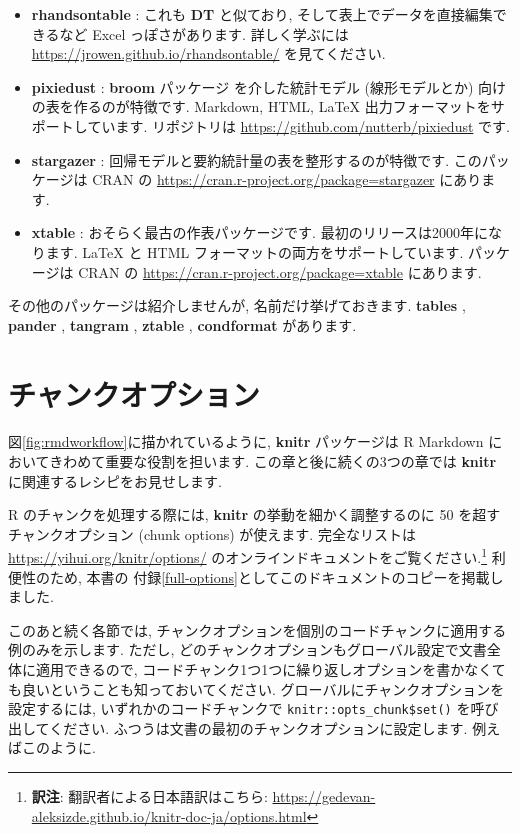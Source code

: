 \documentclass[
  11pt,
  lualatex,ja=standard,jafont=noto]{bxjsreport}
\begin{document}
\begin{itemize}
\item
  \textbf{rhandsontable} \autocite{R-rhandsontable}: これも \textbf{DT} と似ており, そして表上でデータを直接編集できるなど Excel っぽさがあります. 詳しく学ぶには \url{https://jrowen.github.io/rhandsontable/} を見てください.
\item
  \textbf{pixiedust} \autocite{R-pixiedust}: \textbf{broom} パッケージ \autocite{R-broom} を介した統計モデル (線形モデルとか) 向けの表を作るのが特徴です. Markdown, HTML, LaTeX 出力フォーマットをサポートしています. リポジトリは \url{https://github.com/nutterb/pixiedust} です.
\item
  \textbf{stargazer} \autocite{R-stargazer}: 回帰モデルと要約統計量の表を整形するのが特徴です. このパッケージは CRAN の \url{https://cran.r-project.org/package=stargazer} にあります.
\item
  \textbf{xtable} \autocite{R-xtable}: おそらく最古の作表パッケージです. 最初のリリースは2000年になります. LaTeX と HTML フォーマットの両方をサポートしています. パッケージは CRAN の \url{https://cran.r-project.org/package=xtable} にあります.
\end{itemize}

その他のパッケージは紹介しませんが, 名前だけ挙げておきます. \textbf{tables} \autocite{R-tables}, \textbf{pander} \autocite{R-pander}, \textbf{tangram} \autocite{R-tangram}, \textbf{ztable} \autocite{R-ztable}, \textbf{condformat} \autocite{R-condformat} があります.

\hypertarget{chunk-options}{%
\chapter{チャンクオプション}\label{chunk-options}}

図\ref{fig:rmdworkflow}に描かれているように, \textbf{knitr} パッケージは R Markdown においてきわめて重要な役割を担います. この章と後に続くの3つの章では \textbf{knitr} に関連するレシピをお見せします.

R のチャンクを処理する際には, \textbf{knitr} の挙動を細かく調整するのに 50 を超すチャンクオプション (chunk options) が使えます. 完全なリストは \url{https://yihui.org/knitr/options/} のオンラインドキュメントをご覧ください.\footnote{\textbf{訳注}: 翻訳者による日本語訳はこちら: \url{https://gedevan-aleksizde.github.io/knitr-doc-ja/options.html}} 利便性のため, 本書の 付録\ref{full-options}としてこのドキュメントのコピーを掲載しました.

このあと続く各節では, チャンクオプションを個別のコードチャンクに適用する例のみを示します. ただし, どのチャンクオプションもグローバル設定で文書全体に適用できるので, コードチャンク1つ1つに繰り返しオプションを書かなくても良いということも知っておいてください. グローバルにチャンクオプションを設定するには, いずれかのコードチャンクで \texttt{knitr::opts\_chunk\$set()} を呼び出してください. ふつうは文書の最初のチャンクオプションに設定します. 例えばこのように.
\end{document}
